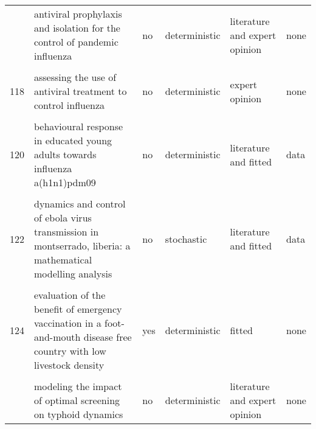 \documentclass[
]{article}
\begin{document}
\begin{landscape}
\begin{longtable}{l>{\raggedright\arraybackslash}p{3cm}l>{\raggedright\arraybackslash}p{3cm}ll}
\addlinespace
116 & antiviral prophylaxis and isolation for the control of pandemic influenza & no & deterministic & literature and expert opinion & none\\
\cellcolor{gray!6}{117} & \cellcolor{gray!6}{assessing the impact of travel restrictions on international spread of the 2014 west african ebola epidemic} & \cellcolor{gray!6}{yes} & \cellcolor{gray!6}{stochastic} & \cellcolor{gray!6}{literature and expert opinion and fitted} & \cellcolor{gray!6}{none}\\
118 & assessing the use of antiviral treatment to control influenza & no & deterministic & expert opinion & none\\
\cellcolor{gray!6}{119} & \cellcolor{gray!6}{behavior in the time of cholera: evidence from the 2008-2009 cholera outbreak in zimbabwe} & \cellcolor{gray!6}{no} & \cellcolor{gray!6}{deterministic} & \cellcolor{gray!6}{fitted} & \cellcolor{gray!6}{data}\\
120 & behavioural response in educated young adults towards influenza a(h1n1)pdm09 & no & deterministic & literature and fitted & data\\
\addlinespace
\cellcolor{gray!6}{121} & \cellcolor{gray!6}{cover your cough! quantifying the benefits of a localized healthy behavior intervention on flu epidemics in washington dc} & \cellcolor{gray!6}{no} & \cellcolor{gray!6}{stochastic} & \cellcolor{gray!6}{literature and expert opinion} & \cellcolor{gray!6}{none}\\
122 & dynamics and control of ebola virus transmission in montserrado, liberia: a mathematical modelling analysis & no & stochastic & literature and fitted & data\\
\cellcolor{gray!6}{123} & \cellcolor{gray!6}{estimating the effectiveness of early control measures through school absenteeism surveillance in observed outbreaks at rural schools in hubei, china} & \cellcolor{gray!6}{no} & \cellcolor{gray!6}{deterministic} & \cellcolor{gray!6}{literature and fitted} & \cellcolor{gray!6}{data}\\
124 & evaluation of the benefit of emergency vaccination in a foot-and-mouth disease free country with low livestock density & yes & deterministic & fitted & none\\
\cellcolor{gray!6}{125} & \cellcolor{gray!6}{modeling the dynamics of oral poliovirus vaccine cessation} & \cellcolor{gray!6}{no} & \cellcolor{gray!6}{deterministic} & \cellcolor{gray!6}{literature} & \cellcolor{gray!6}{none}\\
\addlinespace
126 & modeling the impact of optimal screening on typhoid dynamics & no & deterministic & literature and expert opinion & none\\

\end{longtable}
\end{landscape}
\end{document}
